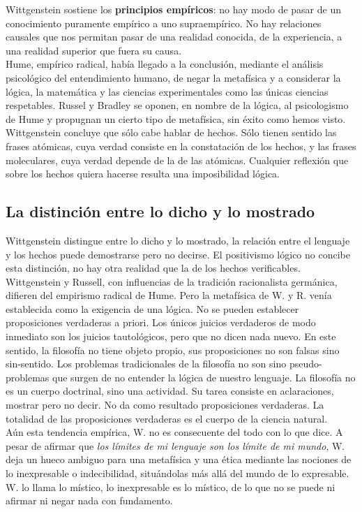 \documentclass[a4paper, 11pt, twocolumn, spanish]{article}
\begin{document}
Wittgenstein sostiene los \textbf{principios empíricos}: no hay modo de pasar
de un conocimiento puramente empírico a uno supraempírico. No hay
relaciones causales que nos permitan pasar de una realidad conocida,
de la experiencia, a una realidad superior que fuera su causa.\\

Hume, empírico radical, había llegado a la conclusión, mediante el
análisis psicológico del entendimiento humano, de negar la metafísica
y a considerar la lógica, la matemática y las ciencias experimentales
como las únicas ciencias respetables. Russel y Bradley se oponen, en
nombre de la lógica, al psicologismo de Hume y propugnan un cierto
tipo de metafísica, sin éxito como hemos visto. Wittgenstein concluye
que sólo cabe hablar de hechos. Sólo tienen sentido las frases
atómicas, cuya verdad consiste en la constatación de los hechos, y las
frases moleculares, cuya verdad depende de la de las
atómicas. Cualquier reflexión que sobre los hechos quiera hacerse
resulta una imposibilidad lógica.

\subsection{La distinción entre lo dicho y lo mostrado}
\label{sec:org2c2bb30}
Wittgenstein distingue entre lo dicho y lo mostrado, la relación entre
el lenguaje y los hechos puede demostrarse pero no decirse. El
positivismo lógico no concibe esta distinción, no hay otra realidad
que la de los hechos verificables. Wittgenstein y Russell, con
influencias de la tradición racionalista germánica, difieren del
empirismo radical de Hume. Pero la metafísica de W. y R. venía
establecida como la exigencia de una lógica. No se pueden establecer
proposiciones verdaderas a priori. Los únicos juicios verdaderos de
modo inmediato son los juicios tautológicos, pero que no dicen nada
nuevo. En este sentido, la filosofía no tiene objeto propio, sus
proposiciones no son falsas sino sin-sentido. Los problemas
tradicionales de la filosofía no son sino pseudo-problemas que surgen
de no entender la lógica de nuestro lenguaje. La filosofía no es un
cuerpo doctrinal, sino una actividad. Su tarea consiste en
aclaraciones, mostrar pero no decir. No da como resultado
proposiciones verdaderas. La totalidad de las proposiciones verdaderas
es el cuerpo de la ciencia natural.\\

Aún esta tendencia empírica, W. no es consecuente del todo con lo que
dice. A pesar de afirmar que \emph{los límites de mi lenguaje son los
límite de mi mundo}, W. deja un hueco ambiguo para una metafísica y
una ética mediante las nociones de lo inexpresable o indecibilidad,
situándolas más allá del mundo de lo expresable. W. lo llama lo
místico, lo inexpresable es lo místico, de lo que no se puede ni
afirmar ni negar nada con fundamento.\\
\end{document}
